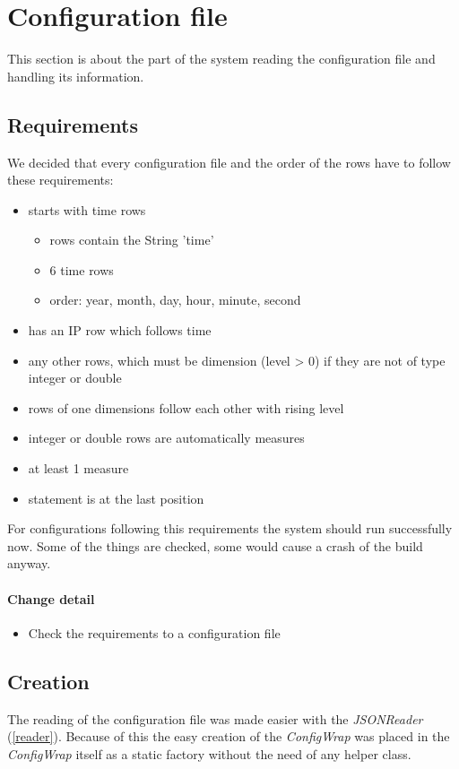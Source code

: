 \section{Configuration file}
This section is about the part of the system reading the configuration file
and handling its information.

\subsection{Requirements}
We decided that every configuration file and the order of the 
rows have to follow these requirements:
\begin{itemize}
  \item starts with time rows
  \begin{itemize}
    \item rows contain the String 'time'
    \item 6 time rows
    \item order: year, month, day, hour, minute, second 
  \end{itemize}
  \item has an IP row which follows time
  \item any other rows, which must be dimension (level > 0) if they are not of
  type integer or double
  \item rows of one dimensions follow each other with rising level
  \item integer or double rows are automatically measures
  \item at least 1 measure
  \item statement is at the last position
\end{itemize} 

For configurations following this requirements the system should run
successfully now. Some of the things are checked, some would cause a crash
of the build anyway.

\paragraph{Change detail}
\begin{itemize}
  \item Check the requirements to a configuration file
\end{itemize}

\subsection{Creation}
The reading of the configuration file was made easier with the
\textit{JSONReader} (\ref{reader}). Because of this the easy creation
of the \textit{ConfigWrap} was placed in the \textit{ConfigWrap} itself as
a static factory without the need of any helper class.

